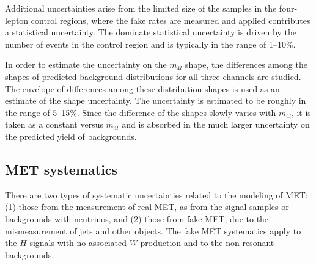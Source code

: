     

Additional uncertainties arise from the limited size of the samples in the four-lepton control regions, where the fake rates are measured and applied contributes a statistical uncertainty. The dominate statistical uncertainty is driven by the number of events in the control region and is typically in the range of 1--10\%.

In order to estimate the uncertainty on the $m_{4l}$ shape, the differences among the shapes of predicted background distributions for all three channels are studied. The envelope of differences among these distribution shapes is used as an estimate of the shape uncertainty. The uncertainty is estimated to be roughly in the range of 5--15\%. Since the difference of the shapes slowly varies with $m_{4l}$, it is taken as a constant versus $m_{4l}$ and is absorbed in the much larger uncertainty on the predicted yield of backgrounds. 


\subsection{MET systematics}\label{sec:metsyst}

There are two types of systematic uncertainties related to the modeling of MET: (1) those from the measurement of real MET, as from the signal samples or backgrounds with neutrinos, and (2) those from fake MET, due to the mismeasurement of jets and other objects. The fake MET systematics apply to the $H$ signals with no associated $W$ production and to the non-resonant backgrounds. 


